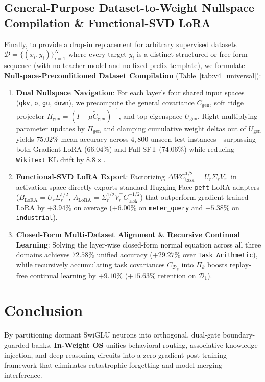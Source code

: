 \documentclass[10pt,twocolumn]{article}
\begin{document}
\subsection{General-Purpose Dataset-to-Weight Nullspace Compilation \& Functional-SVD LoRA}
Finally, to provide a drop-in replacement for arbitrary supervised datasets $\mathcal{D} = \{(x_i, y_i)\}_{i=1}^N$ where every target $y_i$ is a distinct structured or free-form sequence (with no teacher model and no fixed prefix template), we formulate \textbf{Nullspace-Preconditioned Dataset Compilation} (Table~\ref{tab:v4_universal}):
\begin{enumerate}
    \item \textbf{Dual Nullspace Navigation}: For each layer's four shared input spaces (\texttt{qkv}, \texttt{o}, \texttt{gu}, \texttt{down}), we precompute the general covariance $C_{\mathrm{gen}}$, soft ridge projector $\Pi_{\mathrm{gen}} = (I + \mu \tilde{C}_{\mathrm{gen}})^{-1}$, and top eigenspace $U_{\mathrm{gen}}$. Right-multiplying parameter updates by $\Pi_{\mathrm{gen}}$ and clamping cumulative weight deltas out of $U_{\mathrm{gen}}$ yields $\mathbf{75.02\%}$ mean accuracy across $4,800$ unseen test instances---surpassing both Gradient LoRA ($66.04\%$) and Full SFT ($74.06\%$) while reducing \texttt{WikiText} KL drift by $\mathbf{8.8\times}$.
    \item \textbf{Functional-SVD LoRA Export}: Factorizing $\Delta W C_{\mathrm{task}}^{1/2} = U_r \Sigma_r V_r^\top$ in activation space directly exports standard Hugging Face \texttt{peft} LoRA adapters ($B_{\mathrm{LoRA}} = U_r \Sigma_r^{1/2}$, $A_{\mathrm{LoRA}} = \Sigma_r^{1/2} V_r^\top C_{\mathrm{task}}^{-1/2}$) that outperform gradient-trained LoRA by $+3.94\%$ on average ($+6.00\%$ on \texttt{meter\_query} and $+5.38\%$ on \texttt{industrial}).
    \item \textbf{Closed-Form Multi-Dataset Alignment \& Recursive Continual Learning}: Solving the layer-wise closed-form normal equation across all three domains achieves $\mathbf{72.58\%}$ unified accuracy ($+29.27\%$ over \texttt{Task Arithmetic}), while recursively accumulating task covariances $C_{\mathcal{D}_k}$ into $\Pi_k$ boosts replay-free continual learning by $+9.10\%$ ($+15.63\%$ retention on $\mathcal{D}_1$).
\end{enumerate}

\section{Conclusion}
By partitioning dormant SwiGLU neurons into orthogonal, dual-gate boundary-guarded banks, \textbf{In-Weight OS} unifies behavioral routing, associative knowledge injection, and deep reasoning circuits into a zero-gradient post-training framework that eliminates catastrophic forgetting and model-merging interference.
\end{document}
